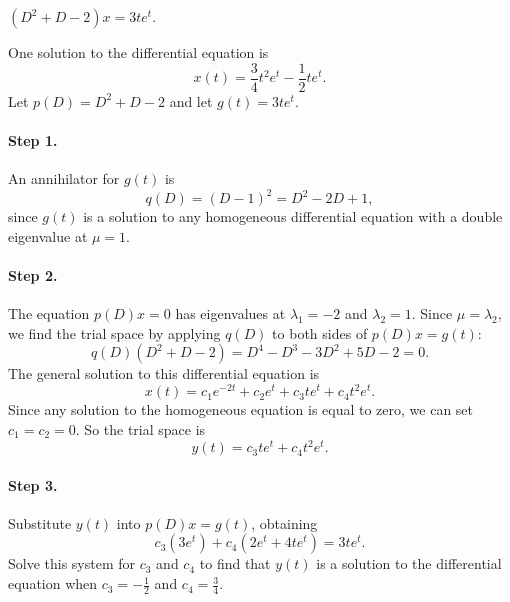 \documentclass{ximera}
\begin{document}
\begin{exercise}  \label{c12.4.4}
$(D^2+D-2)x = 3te^t$.

\begin{solution}
\ans One solution to the differential equation is
\[
x(t) = \frac{3}{4}t^2e^t - \frac{1}{2}te^t.
\]
\soln Let $p(D) = D^2 + D - 2$ and let $g(t) = 3te^t$.

\paragraph{Step 1.} An annihilator for $g(t)$ is
\[
q(D) = (D - 1)^2 = D^2 - 2D + 1,
\]
since $g(t)$ is a solution to any homogeneous differential equation
with a double eigenvalue at $\mu = 1$.

\paragraph{Step 2.} The equation $p(D)x = 0$ has eigenvalues at
$\lambda_1 = -2$ and $\lambda_2 = 1$.  Since $\mu = \lambda_2$, we
find the trial space by applying $q(D)$ to both sides of $p(D)x =
g(t)$:
\[
q(D)(D^2 + D - 2) = D^4 - D^3 - 3D^2 + 5D - 2 = 0.
\]
The general solution to this differential equation is
\[
x(t) = c_1e^{-2t} + c_2e^t + c_3te^t + c_4t^2e^t.
\]
Since any solution to the homogeneous equation is equal to zero, we can set
$c_1 = c_2 = 0$.  So the trial space is
\[
y(t) = c_3te^t + c_4t^2e^t.
\]
\paragraph{Step 3.} Substitute $y(t)$ into $p(D)x = g(t)$, obtaining
\[
c_3(3e^t) + c_4(2e^t + 4te^t) = 3te^t.
\]
Solve this system for $c_3$ and $c_4$ to find that $y(t)$ is a solution
to the differential equation when $c_3 = -\frac{1}{2}$ and
$c_4 = \frac{3}{4}$.

\end{solution}
\end{exercise}
\end{document}
